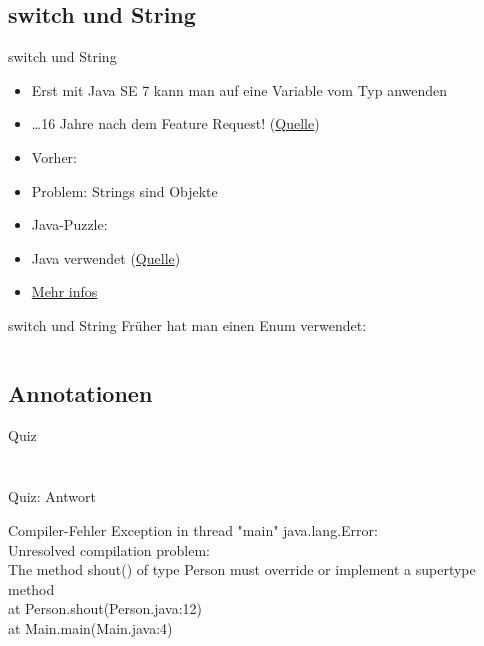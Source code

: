 \documentclass[usepdftitle=false,hyperref={pdfpagelabels=false}]{beamer}
\begin{document}
\subsection{switch und String}
\begin{frame}{switch und String}
    \begin{itemize}[<+->]
        \item Erst mit Java SE 7 kann man  auf eine Variable vom Typ  anwenden
        \item \dots 16 Jahre nach dem Feature Request! (\href{http://bugs.sun.com/bugdatabase/view_bug.do?bug_id=1223179}{Quelle})
        \item Vorher: \\
        \item Problem: Strings sind Objekte
        \item Java-Puzzle: 
        \item Java verwendet  (\href{http://docs.oracle.com/javase/tutorial/java/nutsandbolts/switch.html}{Quelle})
        \item \href{http://stackoverflow.com/a/338230/562769}{Mehr infos}
    \end{itemize}
\end{frame}

\begin{frame}{switch und String}
    Früher hat man einen Enum verwendet:
    \inputminted[linenos=false, numbersep=5pt, tabsize=4, fontsize=\small]{java}{Switch.java}
\end{frame}

\subsection{Annotationen}
\begin{frame}{Quiz}
    \inputminted[linenos=true, numbersep=5pt, tabsize=4, fontsize=\tiny, frame=lines, label=Person.java]{java}{PersonQuiz.java}
    \inputminted[linenos=true, numbersep=5pt, tabsize=4, fontsize=\tiny]{java}{AnnotationQuiz.java}
\end{frame}

\begin{frame}{Quiz: Antwort}
    \begin{block}{Compiler-Fehler}
        Exception in thread "main" java.lang.Error: \\
        Unresolved compilation problem: \\
        The method shout() of type Person must override or implement a supertype method\\
        at Person.shout(Person.java:12)\\
        at Main.main(Main.java:4)
    \end{block}
\end{frame}
\end{document}
